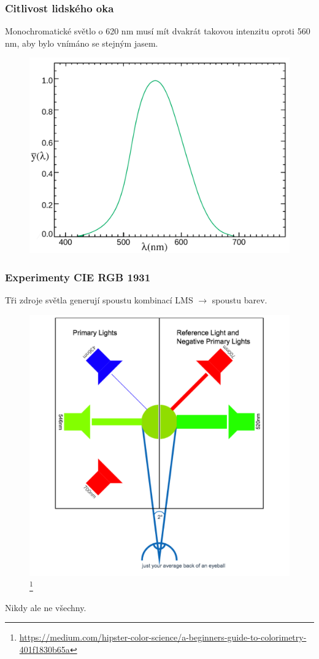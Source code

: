 \documentclass{beamer}
\begin{document}
\begin{frame}
  \center
  \frametitle{Citlivost lidského oka}
  Monochromatické světlo o 620 nm musí mít dvakrát takovou intenzitu oproti 560 nm, aby bylo vnímáno se stejným jasem.
  \begin{figure}
    \includegraphics[height=0.6\textheight]{CIE_1931_Luminosity.pdf}
  \end{figure}
\end{frame}

\begin{frame}
  \center
  \frametitle{Experimenty CIE RGB 1931}
  Tři zdroje světla generují spoustu kombinací LMS $\rightarrow$ spoustu barev.
  \begin{figure}
    \includegraphics[height=0.5\textheight]{observer.png}
    \footnote{\url{https://medium.com/hipster-color-science/a-beginners-guide-to-colorimetry-401f1830b65a}}
  \end{figure}
  Nikdy ale ne všechny.
\end{frame}
\end{document}
